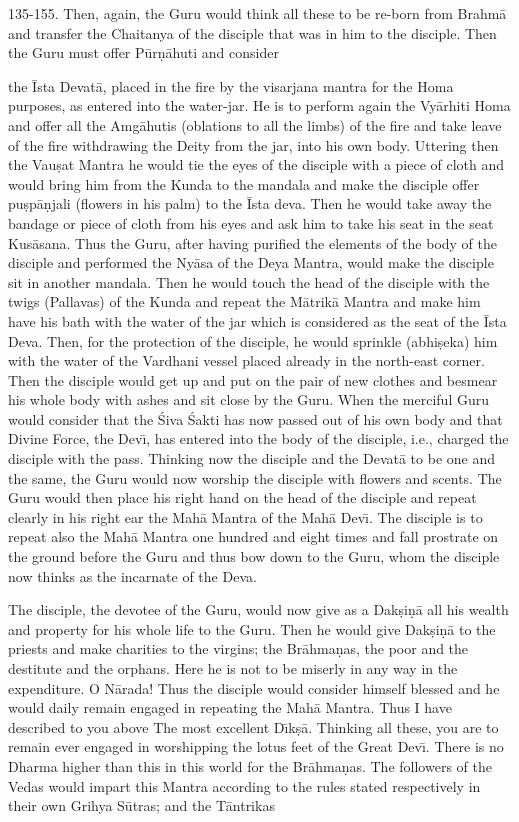 135-155. Then, again, the Guru would think all these to be re-born from Brahm\=a and transfer the Chaitanya of the disciple that was in him to the disciple. Then the Guru must offer P\=ur\d{n}\=ahuti and consider

the \=Ista Devat\=a, placed in the fire by the visarjana mantra for the Homa purposes, as entered into the water-jar. He is to perform again the Vy\=arhiti Homa and offer all the Amg\=ahutis (oblations to all the limbs) of the fire and take leave of the fire withdrawing the Deity from the jar, into his own body. Uttering then the Vau\d{s}at Mantra he would tie the eyes of the disciple with a piece of cloth and would bring him from the Kunda to the mandala and make the disciple offer pu\d{s}p\=a\d{n}jali (flowers in his palm) to the \=Ista deva. Then he would take away the bandage or piece of cloth from his eyes and ask him to take his seat in the seat Kus\=asana. Thus the Guru, after having purified the elements of the body of the disciple and performed the Ny\=asa of the Deya Mantra, would make the disciple sit in another mandala. Then he would touch the head of the disciple with the twigs (Pallavas) of the Kunda and repeat the M\=atrik\=a Mantra and make him have his bath with the water of the jar which is considered as the seat of the \=Ista Deva. Then, for the protection of the disciple, he would sprinkle (abhi\d{s}eka) him with the water of the Vardhani vessel placed already in the north-east corner. Then the disciple would get up and put on the pair of new clothes and besmear his whole body with ashes and sit close by the Guru. When the merciful Guru would consider that the \'Siva \'Sakti has now passed out of his own body and that Divine Force, the Dev\={\i}, has entered into the body of the disciple, i.e., charged the disciple with the pass. Thinking now the disciple and the Devat\=a to be one and the same, the Guru would now worship the disciple with flowers and scents. The Guru would then place his right hand on the head of the disciple and repeat clearly in his right ear the Mah\=a Mantra of the Mah\=a Dev\={\i}. The disciple is to repeat also the Mah\=a Mantra one hundred and eight times and fall prostrate on the ground before the Guru and thus bow down to the Guru, whom the disciple now thinks as the incarnate of the Deva.

The disciple, the devotee of the Guru, would now give as a Dak\d{s}i\d{n}\=a all his wealth and property for his whole life to the Guru. Then he would give Dak\d{s}i\d{n}\=a to the priests and make charities to the virgins; the Br\=ahma\d{n}as, the poor and the destitute and the orphans. Here he is not to be miserly in any way in the expenditure. O N\=arada! Thus the disciple would consider himself blessed and he would daily remain engaged in repeating the Mah\=a Mantra. Thus I have described to you above
The most excellent D\={\i}k\d{s}\=a. Thinking all these, you are to remain ever engaged in worshipping the lotus feet of the Great Dev\={\i}. There is no Dharma higher than this in this world for the Br\=ahma\d{n}as. The followers of the Vedas would impart this Mantra according to the rules stated respectively in their own Grihya S\=utras; and the T\=antrikas

